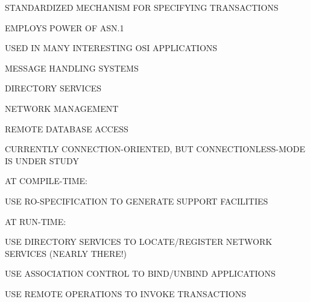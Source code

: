 \begin{bwslide}

\begin{nrtc}
\item	STANDARDIZED MECHANISM FOR SPECIFYING TRANSACTIONS

\item	EMPLOYS POWER OF ASN.1

\item	USED IN MANY INTERESTING OSI APPLICATIONS
    \begin{nrtc}
    \item	MESSAGE HANDLING SYSTEMS

    \item	DIRECTORY SERVICES

    \item	NETWORK MANAGEMENT

    \item	REMOTE DATABASE ACCESS
    \end{nrtc}

\item	CURRENTLY CONNECTION-ORIENTED, BUT CONNECTIONLESS-MODE IS UNDER STUDY
\end{nrtc}
\end{bwslide}


\begin{bwslide}

\begin{nrtc}
\item	AT COMPILE-TIME:
    \begin{nrtc}
    \item	USE RO-SPECIFICATION TO GENERATE SUPPORT FACILITIES
    \end{nrtc}

\item	AT RUN-TIME:
    \begin{nrtc}
    \item	USE DIRECTORY SERVICES TO LOCATE/REGISTER NETWORK SERVICES
		(NEARLY THERE!)

    \item	USE ASSOCIATION CONTROL TO BIND/UNBIND APPLICATIONS

    \item	USE REMOTE OPERATIONS TO INVOKE TRANSACTIONS
    \end{nrtc}
\end{nrtc}
\end{bwslide}




